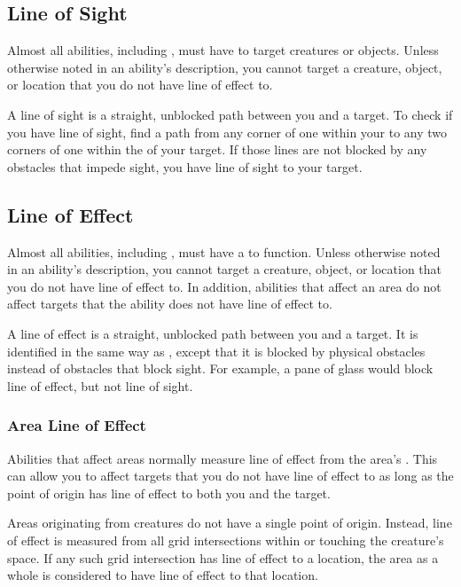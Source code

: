     \subsection{Line of Sight}\label{Line of Sight}
        Almost all abilities, including , must have  to target creatures or objects.
        Unless otherwise noted in an ability's description, you cannot target a creature, object, or location that you do not have line of effect to.

        A line of sight is a straight, unblocked path between you and a target.
        To check if you have line of sight, find a path from any corner of one  within your  to any two corners of one  within the  of your target.
        If those lines are not blocked by any obstacles that impede sight, you have line of sight to your target.

    \subsection{Line of Effect}\label{Line of Effect}

        Almost all abilities, including , must have a  to function.
        Unless otherwise noted in an ability's description, you cannot target a creature, object, or location that you do not have line of effect to.
        In addition, abilities that affect an area do not affect targets that the ability does not have line of effect to.

        A line of effect is a straight, unblocked path between you and a target.
        It is identified in the same way as , except that it is blocked by physical obstacles instead of obstacles that block sight.
        For example, a pane of glass would block line of effect, but not line of sight.

        \subsubsection{Area Line of Effect}\label{Area Line of Effect}
            Abilities that affect areas normally measure line of effect from the area's .
            This can allow you to affect targets that you do not have line of effect to as long as the point of origin has line of effect to both you and the target.

            Areas originating from creatures do not have a single point of origin.
            Instead, line of effect is measured from all grid intersections within or touching the creature's space.
            If any such grid intersection has line of effect to a location, the area as a whole is considered to have line of effect to that location.

